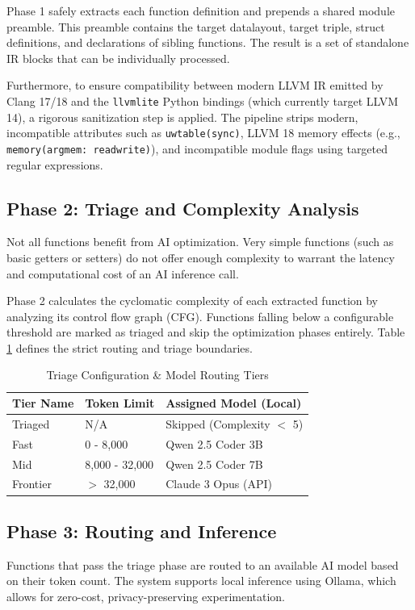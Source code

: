 \documentclass[conference,10pt]{IEEEtran}
\begin{document}
Phase 1 safely extracts each function definition and prepends a shared module preamble. This preamble contains the target datalayout, target triple, struct definitions, and declarations of sibling functions. The result is a set of standalone IR blocks that can be individually processed. 

Furthermore, to ensure compatibility between modern LLVM IR emitted by Clang 17/18 and the \texttt{llvmlite} Python bindings (which currently target LLVM 14), a rigorous sanitization step is applied. The pipeline strips modern, incompatible attributes such as \texttt{uwtable(sync)}, LLVM 18 memory effects (e.g., \texttt{memory(argmem: readwrite)}), and incompatible module flags using targeted regular expressions.

\subsection{Phase 2: Triage and Complexity Analysis}
Not all functions benefit from AI optimization. Very simple functions (such as basic getters or setters) do not offer enough complexity to warrant the latency and computational cost of an AI inference call. 

Phase 2 calculates the cyclomatic complexity of each extracted function by analyzing its control flow graph (CFG). Functions falling below a configurable threshold are marked as triaged and skip the optimization phases entirely. Table \ref{tab:triage} defines the strict routing and triage boundaries.

\begin{table}[htbp]
\caption{Triage Configuration \& Model Routing Tiers}
\label{tab:triage}
\begin{center}
\begin{tabular}{|l|l|l|}
\hline
\textbf{Tier Name} & \textbf{Token Limit} & \textbf{Assigned Model (Local)} \\
\hline
Triaged & N/A & Skipped (Complexity $<$ 5) \\
Fast & 0 - 8,000 & Qwen 2.5 Coder 3B \\
Mid & 8,000 - 32,000 & Qwen 2.5 Coder 7B \\
Frontier & $>$ 32,000 & Claude 3 Opus (API) \\
\hline
\end{tabular}
\end{center}
\end{table}

\subsection{Phase 3: Routing and Inference}
Functions that pass the triage phase are routed to an available AI model based on their token count. The system supports local inference using Ollama, which allows for zero-cost, privacy-preserving experimentation. 
\end{document}

